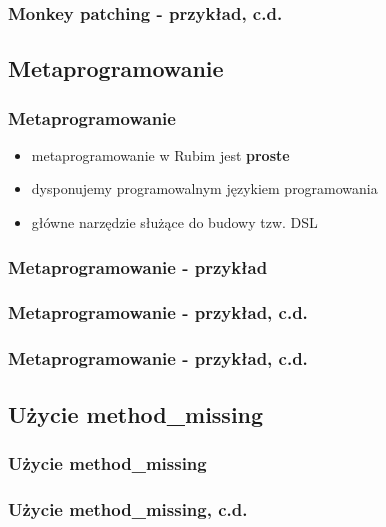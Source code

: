 \documentclass[12t]{beamer}
\begin{document}
\begin{frame}
  \frametitle{Monkey patching - przykład, c.d.}
  
\end{frame}

\subsection{Metaprogramowanie}

\begin{frame}
  \frametitle{Metaprogramowanie}
  \begin{itemize}
  \item metaprogramowanie w Rubim jest \textbf{proste}
  \item dysponujemy programowalnym językiem programowania
  \item główne narzędzie służące do budowy tzw. DSL
  \end{itemize}
\end{frame}

\begin{frame}[fragile]
  \frametitle{Metaprogramowanie - przykład}
  
\end{frame}

\begin{frame}[fragile]
  \frametitle{Metaprogramowanie - przykład, c.d.}
  
\end{frame}

\begin{frame}[fragile]
  \frametitle{Metaprogramowanie - przykład, c.d.}
  
\end{frame}

\subsection{Użycie method\_missing}
\begin{frame}[fragile]
  \frametitle{Użycie method\_missing}
  
\end{frame}

\begin{frame}[fragile]
  \frametitle{Użycie method\_missing, c.d.}
  
\end{frame}
\end{document}
